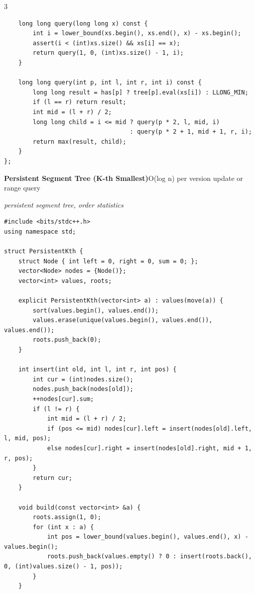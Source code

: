 \documentclass[8pt,a4paper,landscape]{article}
\begin{document}
\begin{multicols}{3}
\begin{lstlisting}
    long long query(long long x) const {
        int i = lower_bound(xs.begin(), xs.end(), x) - xs.begin();
        assert(i < (int)xs.size() && xs[i] == x);
        return query(1, 0, (int)xs.size() - 1, i);
    }

    long long query(int p, int l, int r, int i) const {
        long long result = has[p] ? tree[p].eval(xs[i]) : LLONG_MIN;
        if (l == r) return result;
        int mid = (l + r) / 2;
        long long child = i <= mid ? query(p * 2, l, mid, i)
                                   : query(p * 2 + 1, mid + 1, r, i);
        return max(result, child);
    }
};
\end{lstlisting}
\vspace{1pt}
\textbf{Persistent Segment Tree (K-th Smallest)}\hfill{\scriptsize O(log n) per version update or range query}\par
{\scriptsize\itshape persistent segment tree, order statistics}\par
\begin{lstlisting}
#include <bits/stdc++.h>
using namespace std;

struct PersistentKth {
    struct Node { int left = 0, right = 0, sum = 0; };
    vector<Node> nodes = {Node()};
    vector<int> values, roots;

    explicit PersistentKth(vector<int> a) : values(move(a)) {
        sort(values.begin(), values.end());
        values.erase(unique(values.begin(), values.end()), values.end());
        roots.push_back(0);
    }

    int insert(int old, int l, int r, int pos) {
        int cur = (int)nodes.size();
        nodes.push_back(nodes[old]);
        ++nodes[cur].sum;
        if (l != r) {
            int mid = (l + r) / 2;
            if (pos <= mid) nodes[cur].left = insert(nodes[old].left, l, mid, pos);
            else nodes[cur].right = insert(nodes[old].right, mid + 1, r, pos);
        }
        return cur;
    }

    void build(const vector<int> &a) {
        roots.assign(1, 0);
        for (int x : a) {
            int pos = lower_bound(values.begin(), values.end(), x) - values.begin();
            roots.push_back(values.empty() ? 0 : insert(roots.back(), 0, (int)values.size() - 1, pos));
        }
    }


\end{lstlisting}
\end{multicols}
\end{document}
